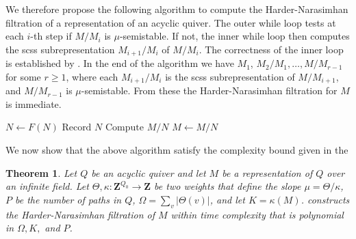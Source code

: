 \documentclass[a4paper]{amsart}
\numberwithin{equation}{section}
\theoremstyle{plain}
\newtheorem{theorem}{Theorem}[section]
\theoremstyle{definition}
\begin{document}
We therefore propose the following algorithm to compute the Harder-Narasimhan filtration of a representation of an acyclic quiver. The outer while loop tests at each $i$-th step if $M/M_i$ is $\mu$-semistable. If not, the inner while loop then  computes the scss subrepresentation $M_{i+1}/M_i$ of $M/M_i$. The correctness of the inner loop is established by . In the end of the algorithm we have $M_1$, $M_2/M_1,\ldots,M/M_{r-1}$ for some $r\geq 1$, where each $M_{i+1}/M_{i}$ is the scss subrepresentation of $M/M_{i+1}$, and $M/M_{r-1}$ is $\mu$-semistable. From these the Harder-Narasimhan filtration for $M$ is immediate.
\begin{algorithm}[H]
\begin{flushleft}
\end{flushleft}
\begin{algorithmic}
\caption{An algorithm for Harder-Narasimhan filtrations}\label{HN_alg_psuedo_code}
     
\EndIf
{}
        \State $N\gets F(N)$
    \EndWhile
    \State $\text{Record }N$ 
    \State $\text{Compute }M/N$
    \State $M\gets M/N$
\EndWhile
\end{algorithmic}
\end{algorithm}

We now show that the above algorithm satisfy the complexity bound given in the
\begin{theorem}\label{thmB_part_I}
Let $Q$ be an acyclic quiver and let $M$ be a representation of $Q$ over an infinite field. Let   $\Theta,\kappa:\mathbf{Z}^{Q_0}\rightarrow\mathbf{Z}$ be two weights that define the slope $\mu=\Theta/\kappa$, $P$ be the number of paths in $Q$, $\Omega=\sum_{v}|\Theta(v)|$, and let  $K=\kappa(M)$.  constructs the Harder-Narasimhan filtration of $M$ within time complexity that is polynomial in $\Omega,K,$ and $P$. 
\end{theorem}
\end{document}
